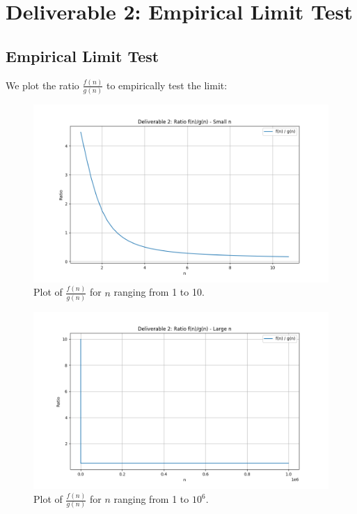 \documentclass{article}
\begin{document}
\section{Deliverable 2: Empirical Limit Test}

\subsection{Empirical Limit Test}

We plot the ratio $\frac{f(n)}{g(n)}$ to empirically test the limit:

\begin{figure}[H]
    \centering
    \includegraphics[width=\textwidth]{plot_deliverable2_ratio_smalln.png}
    \caption{Plot of $\frac{f(n)}{g(n)}$ for $n$ ranging from 1 to 10.}
    \label{fig:ratio_fn_gn_1_10}
\end{figure}

\begin{figure}[H]
    \centering
    \includegraphics[width=\textwidth]{plot_deliverable2_ratio_largen.png}
    \caption{Plot of $\frac{f(n)}{g(n)}$ for $n$ ranging from 1 to $10^6$.}
    \label{fig:ratio_fn_gn_1_10e6}
\end{figure}
\end{document}
